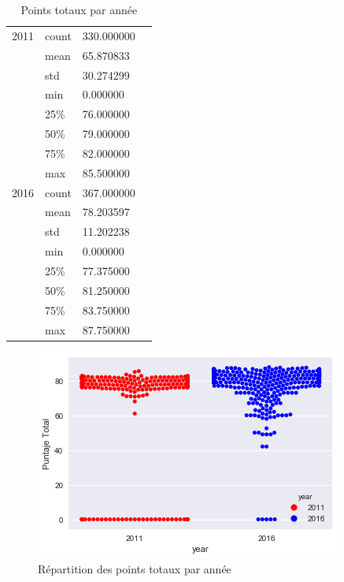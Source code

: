 \begin{table}[H]
	\centering
	\caption{Points totaux par année}
	\label{YearlyPuntajeTotal}
	\begin{tabular}{llll}
		2011 & count & 330.000000 &  \\
		&mean & 65.870833 &    \\
		&std & 30.274299 &    \\
		&min & 0.000000 &    \\
		&25\% & 76.000000 &    \\
		&50\% & 79.000000 &    \\
		&75\% & 82.000000 &    \\
		&max & 85.500000 &    \\
		2016 & count & 367.000000   \\
		&mean & 78.203597 &    \\
		&std & 11.202238 &    \\
		&min & 0.000000 &    \\
		&25\% & 77.375000 &    \\
		&50\% & 81.250000 &    \\
		&75\% & 83.750000 &    \\
		&max & 87.750000& 
	\end{tabular}
\end{table}




\begin{figure}[H]
	\centering
	\includegraphics[width=0.7\linewidth]{img/Exploration/PointTotauxEtc}
	\caption{Répartition des points totaux par année}
	\label{fig:pointtotauxetc}
\end{figure}



















